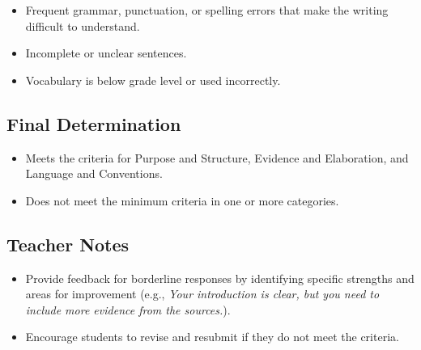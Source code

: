 \documentclass[12pt]{article}
\begin{document}
\begin{tcolorbox}[colframe=black!60, colback=white, title=Fail Criteria]
\begin{itemize}
    \item Frequent grammar, punctuation, or spelling errors that make the writing difficult to understand.
    \item Incomplete or unclear sentences.
    \item Vocabulary is below grade level or used incorrectly.
\end{itemize}
\end{tcolorbox}

\subsection*{Final Determination}
\begin{tcolorbox}[colframe=black!60, colback=white, title=Pass]
\begin{itemize}
    \item Meets the criteria for Purpose and Structure, Evidence and Elaboration, and Language and Conventions.
\end{itemize}
\end{tcolorbox}

\begin{tcolorbox}[colframe=black!60, colback=white, title=Fail]
\begin{itemize}
    \item Does not meet the minimum criteria in one or more categories.
\end{itemize}
\end{tcolorbox}

\subsection*{Teacher Notes}
\begin{itemize}
    \item Provide feedback for borderline responses by identifying specific strengths and areas for improvement (e.g., \textit{Your introduction is clear, but you need to include more evidence from the sources.}).
    \item Encourage students to revise and resubmit if they do not meet the criteria.
\end{itemize}
\end{document}

